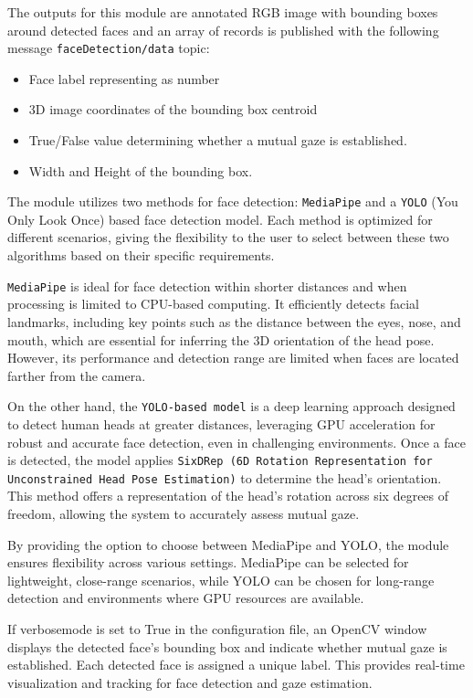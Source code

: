 \documentclass{CSSRforAfrica}
\begin{document}
The outputs for this module are annotated RGB image with bounding boxes around detected faces and an array of records is published with the following message \texttt{faceDetection/data} topic:
\begin{itemize}
	\item Face label representing as number
	\item 3D image coordinates of the bounding box centroid
	\item True/False value determining whether a mutual gaze is established.
	\item Width and Height of the bounding box.
	
\end{itemize}

The module utilizes two methods for face detection: \texttt{MediaPipe} and a \texttt{YOLO} (You Only Look Once) \cite{yolo} based face detection model. Each method is optimized for different scenarios, giving the flexibility to the user to select between these two algorithms based on their specific requirements.

\texttt{MediaPipe} is ideal for face detection within shorter distances and when processing is limited to CPU-based computing. It efficiently detects facial landmarks, including key points such as the distance between the eyes, nose, and mouth, which are essential for inferring the 3D orientation of the head pose. However, its performance and detection range are limited when faces are located farther from the camera.

On the other hand, the \texttt{YOLO-based model} is a deep learning approach designed to detect human heads at greater distances, leveraging GPU acceleration for robust and accurate face detection, even in challenging environments. Once a face is detected, the model applies \texttt{SixDRep (6D Rotation Representation for Unconstrained Head Pose Estimation)} \cite{sixdrepnet} to determine the head’s orientation. This method offers a representation of the head’s rotation across six degrees of freedom, allowing the system to accurately assess mutual gaze.

By providing the option to choose between MediaPipe and YOLO, the module ensures flexibility across various settings. MediaPipe can be selected for lightweight, close-range scenarios, while YOLO can be chosen for long-range detection and environments where GPU resources are available.

If verbosemode is set to True in the configuration file, an OpenCV window displays the detected face's bounding box and indicate whether mutual gaze is established. Each detected face is assigned a unique label. This provides real-time visualization and tracking for face detection and gaze estimation. 
\end{document}
